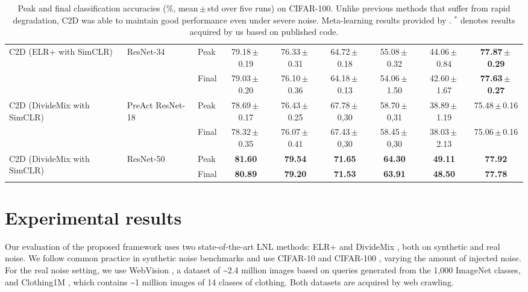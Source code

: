 \documentclass[10pt,twocolumn,letterpaper]{article}
\renewcommand{\cite}[1]{\citep{#1}}
\newcommand{\eb}[1]{{\scriptsize\,$\pm$\,#1}}
\begin{document}
\begin{table*}
{\begin{tabular}{@{\extracolsep{4pt}}l l l ccccc c@{}}
	\midrule	
\multirow{2}{*}{C2D (ELR+ with SimCLR)}  & \multirow{2}{*}{ResNet-34 }      & Peak  & 79.18\eb{0.19}&	76.33\eb{0.31}& 64.72\eb{0.18}&55.08\eb{0.32} &  44.06\eb{0.84}  & \textbf{77.87\eb{0.29}}\\	            
			                &                               & Final  & 79.03\eb{0.20}  & 76.10\eb{0.36} & 64.18\eb{0.13} &   54.06\eb{1.50}   &  42.60\eb{1.67}  &  \textbf{77.63\eb{0.27}} \\	        	
\midrule		
\multirow{2}{*}{C2D (DivideMix with SimCLR) } &    \multirow{2}{*}{PreAct ResNet-18} 	& Peak & 78.69\eb{0.17}     & 76.43\eb{0.25}    &67.78\eb{0,30}      &58.70\eb{0,31}& 38.89\eb{1.19}&       75.48\eb{0.16}   \\	            
         &                    & Final                               & 78.32\eb{0.35}      & 76.07\eb{0.41}     &67.43\eb{0,30}      &58.45\eb{0,30}& 38.03\eb{2.13}&       75.06\eb{0.16}     \\	
\midrule		
\multirow{2}{*}{C2D (DivideMix with SimCLR) } &     \multirow{2}{*}{ResNet-50 }	& Peak & \textbf{81.60}      & \textbf{79.54}     &\textbf{71.65}      &\textbf{64.30}& \textbf{49.11} & \textbf{77.92}     \\	            
&&                                                                Final & \textbf{80.89}      & \textbf{79.20}     &\textbf{71.53}      &\textbf{63.91}& \textbf{48.50} & \textbf{77.78}     \\	
\bottomrule
\end{tabular}
}
	\caption{
			Peak and final classification accuracies (\%,  mean\eb{std} over five runs) on CIFAR-100. Unlike previous methods that suffer from rapid degradation, C2D was able to maintain good performance even under severe noise. Meta-learning results provided by \citet{li2020dividemix}. $^*$ denotes results acquired by us based on published code.
		}
	\label{tbl:cifar100}
\end{table*}	 
\section{Experimental results}
\label{sec:exp}

Our evaluation of the proposed framework uses two state-of-the-art LNL methods: ELR+ \cite{liu2020earlylearning} and DivideMix \cite{li2020dividemix}, both on synthetic and real noise. We follow common practice in synthetic noise benchmarks and use CIFAR-10 and CIFAR-100 \cite{krizhevsky2009cifar}, varying the amount of injected noise. For the real noise setting, we use WebVision \cite{li2017webvision}, a dataset of \textasciitilde2.4 million images based on queries generated from the 1,000 ImageNet \cite{ILSVRC15} classes, and Clothing1M \cite{xiao2015learning}, which contains \textasciitilde1 million images of 14 classes of clothing. Both datasets are acquired by web crawling.
\end{document}

